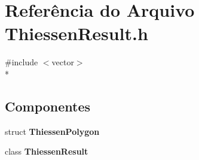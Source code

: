 \section{Referência do Arquivo Thiessen\+Result.\+h}
\label{_thiessen_result_8h}
{\ttfamily \#include $<$vector$>$}\\*
\subsection*{Componentes}
\begin{DoxyCompactItemize}
\item 
struct {\bf Thiessen\+Polygon}
\item 
class {\bf Thiessen\+Result}
\end{DoxyCompactItemize}
